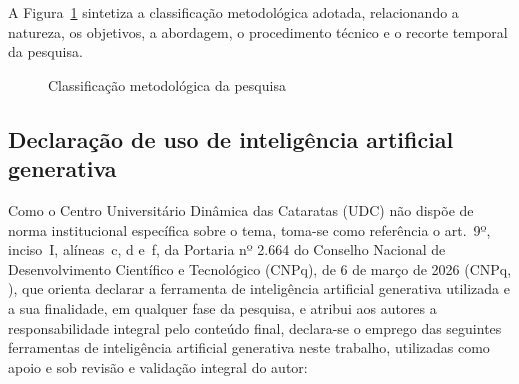 A Figura~\ref{fig:classificacao_pesquisa} sintetiza a classificação metodológica adotada, relacionando a natureza, os objetivos, a abordagem, o procedimento técnico e o recorte temporal da pesquisa.

\begin{figure}[htb]
\centering
\caption{Classificação metodológica da pesquisa}
\label{fig:classificacao_pesquisa}
\end{figure}

\subsection{Declaração de uso de inteligência artificial generativa}
\label{subsec:declaracao_ia}

Como o Centro Universitário Dinâmica das Cataratas (UDC) não dispõe de norma institucional específica sobre o tema, toma-se como referência o art.~9º, inciso~I, alíneas~c, d e~f, da Portaria nº 2.664 do Conselho Nacional de Desenvolvimento Científico e Tecnológico (CNPq), de 6 de março de 2026 (CNPq, \citeyear{CNPqPortaria2664}), que orienta declarar a ferramenta de inteligência artificial generativa utilizada e a sua finalidade, em qualquer fase da pesquisa, e atribui aos autores a responsabilidade integral pelo conteúdo final, declara-se o emprego das seguintes ferramentas de inteligência artificial generativa neste trabalho, utilizadas como apoio e sob revisão e validação integral do autor:


